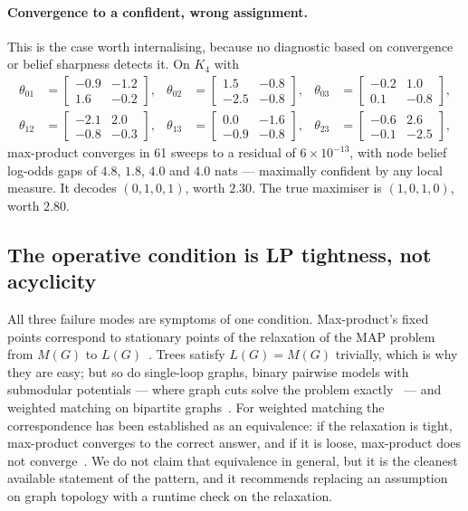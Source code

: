 \paragraph{Convergence to a confident, wrong assignment.} This is the case worth internalising, because no diagnostic based on convergence or belief sharpness detects it. On $K_4$ with
\begin{align*}
    \theta_{01} &= \begin{bmatrix}-0.9 & -1.2\\ 1.6 & -0.2\end{bmatrix}\!, &
    \theta_{02} &= \begin{bmatrix}1.5 & -0.8\\ -2.5 & -0.8\end{bmatrix}\!, &
    \theta_{03} &= \begin{bmatrix}-0.2 & 1.0\\ 0.1 & -0.8\end{bmatrix}\!, \\
    \theta_{12} &= \begin{bmatrix}-2.1 & 2.0\\ -0.8 & -0.3\end{bmatrix}\!, &
    \theta_{13} &= \begin{bmatrix}0.0 & -1.6\\ -0.9 & -0.8\end{bmatrix}\!, &
    \theta_{23} &= \begin{bmatrix}-0.6 & 2.6\\ -0.1 & -2.5\end{bmatrix}\!,
\end{align*}
max-product converges in 61 sweeps to a residual of $6 \times 10^{-13}$, with node belief log-odds gaps of $4.8$, $1.8$, $4.0$ and $4.0$ nats --- maximally confident by any local measure. It decodes $(0,1,0,1)$, worth $2.30$. The true maximiser is $(1,0,1,0)$, worth $2.80$.

\subsection{The operative condition is LP tightness, not acyclicity}

All three failure modes are symptoms of one condition. Max-product's fixed points correspond to stationary points of the relaxation of the MAP problem from $M(G)$ to $L(G)$~\citep{Wainwright2005}. Trees satisfy $L(G) = M(G)$ trivially, which is why they are easy; but so do single-loop graphs, binary pairwise models with submodular potentials --- where graph cuts solve the problem exactly~\citep{Boykov2001} --- and weighted matching on bipartite graphs~\citep{Bayati2008}. For weighted matching the correspondence has been established as an equivalence: if the relaxation is tight, max-product converges to the correct answer, and if it is loose, max-product does not converge~\citep{Sanghavi2007}. We do not claim that equivalence in general, but it is the cleanest available statement of the pattern, and it recommends replacing an assumption on graph topology with a runtime check on the relaxation.

